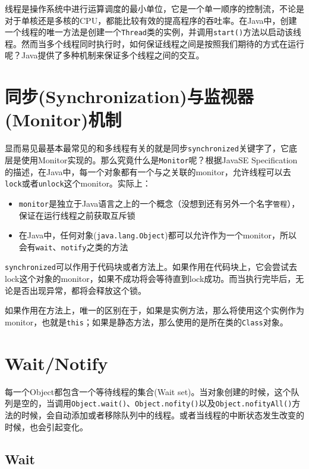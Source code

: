 \documentclass[12pt]{article}
\begin{document}
\makeblogtitle

线程是操作系统中进行运算调度的最小单位，它是一个单一顺序的控制流，不论是对于单核还是多核的CPU，都能比较有效的提高程序的吞吐率。在Java中，创建一个线程的唯一方法是创建一个\texttt{Thread}类的实例，并调用\texttt{start()}方法以启动该线程。然而当多个线程同时执行时，如何保证线程之间是按照我们期待的方式在运行呢？Java提供了多种机制来保证多个线程之间的交互。

\section{同步(Synchronization)与监视器(Monitor)机制}\label{ux540cux6b65synchronizationux4e0eux76d1ux89c6ux5668monitorux673aux5236}

显而易见最基本最常见的和多线程有关的就是同步\texttt{synchronized}关键字了，它底层是使用Monitor实现的。那么究竟什么是\texttt{Monitor}呢？根据JavaSE Specification的描述，在Java中，每一个对象都有一个与之关联的monitor，允许线程可以去\texttt{lock}或者\texttt{unlock}这个monitor。实际上：

\begin{itemize}
\tightlist
\item
  \texttt{monitor}是独立于Java语言之上的一个概念（没想到还有另外一个名字\texttt{管程}），保证在运行线程之前获取互斥锁
\item
  在Java中，任何对象(\texttt{java.lang.Object})都可以允许作为一个monitor，所以会有\texttt{wait}、\texttt{notify}之类的方法
\end{itemize}

\texttt{synchronized}可以作用于代码块或者方法上。如果作用在代码块上，它会尝试去lock这个对象的monitor，如果不成功将会等待直到lock成功。而当执行完毕后，无论是否出现异常，都将会释放这个锁。

如果作用在方法上，唯一的区别在于，如果是实例方法，那么将使用这个实例作为monitor，也就是\texttt{this}；如果是静态方法，那么使用的是所在类的\texttt{Class}对象。

\section{Wait/Notify}\label{waitnotify}

每一个Object都包含一个等待线程的集合(Wait set)。当对象创建的时候，这个队列是空的，当调用\texttt{Object.wait()}、\texttt{Object.nofity()}以及\texttt{Object.nofityAll()}方法的时候，会自动添加或者移除队列中的线程。或者当线程的中断状态发生改变的时候，也会引起变化。

\subsection{Wait}\label{wait}
\end{document}
